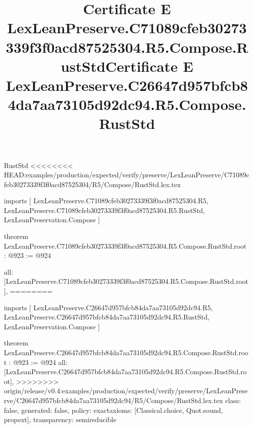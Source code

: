 \begin{lexlean}{RustStd}
<<<<<<<< HEAD:examples/production/expected/verify/preserve/LexLeanPreserve/C71089cfeb30273339f3f0acd87525304/R5/Compose/RustStd.lex.tex
\title{Certificate E LexLeanPreserve.C71089cfeb30273339f3f0acd87525304.R5.Compose.RustStd}
\begin{coremodule}
imports [
  LexLeanPreserve.C71089cfeb30273339f3f0acd87525304.R5,
  LexLeanPreserve.C71089cfeb30273339f3f0acd87525304.R5.RustStd,
  LexLeanPreservation.Compose
]

theorem LexLeanPreserve.C71089cfeb30273339f3f0acd87525304.R5.Compose.RustStd.root : @923 := @924 {
  all: [LexLeanPreserve.C71089cfeb30273339f3f0acd87525304.R5.Compose.RustStd.root],
========
\title{Certificate E LexLeanPreserve.C26647d957bfcb84da7aa73105d92dc94.R5.Compose.RustStd}
\begin{coremodule}
imports [
  LexLeanPreserve.C26647d957bfcb84da7aa73105d92dc94.R5,
  LexLeanPreserve.C26647d957bfcb84da7aa73105d92dc94.R5.RustStd,
  LexLeanPreservation.Compose
]

theorem LexLeanPreserve.C26647d957bfcb84da7aa73105d92dc94.R5.Compose.RustStd.root : @923 := @924 {
  all: [LexLeanPreserve.C26647d957bfcb84da7aa73105d92dc94.R5.Compose.RustStd.root],
>>>>>>>> origin/release/v0.4:examples/production/expected/verify/preserve/LexLeanPreserve/C26647d957bfcb84da7aa73105d92dc94/R5/Compose/RustStd.lex.tex
  class: false,
  generated: false,
  policy: exact{axioms: [Classical.choice, Quot.sound, propext]},
  transparency: semireducible
}


\end{coremodule}}
\end{coremodule}
\end{lexlean}
